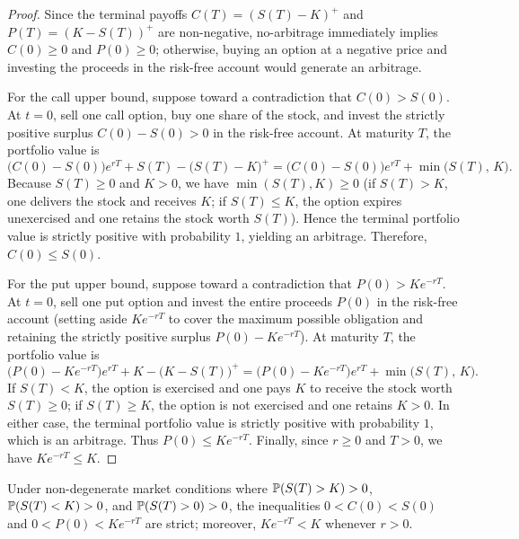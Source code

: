 \begin{proof}
Since the terminal payoffs $C(T) = (S(T) - K)^+$ and $P(T) = (K - S(T))^+$ are non-negative, no-arbitrage immediately implies $C(0) \ge 0$ and $P(0) \ge 0$; otherwise, buying an option at a negative price and investing the proceeds in the risk-free account would generate an arbitrage.

For the call upper bound, suppose toward a contradiction that $C(0) > S(0)$. At $t = 0$, sell one call option, buy one share of the stock, and invest the strictly positive surplus $C(0) - S(0) > 0$ in the risk-free account. At maturity $T$, the portfolio value is
\[
    \bigl(C(0) - S(0)\bigr) e^{rT} + S(T) - \bigl(S(T) - K\bigr)^+ = \bigl(C(0) - S(0)\bigr) e^{rT} + \min\bigl(S(T),\, K\bigr).
\]
Because $S(T) \ge 0$ and $K > 0$, we have $\min(S(T), K) \ge 0$ (if $S(T) > K$, one delivers the stock and receives $K$; if $S(T) \le K$, the option expires unexercised and one retains the stock worth $S(T)$). Hence the terminal portfolio value is strictly positive with probability $1$, yielding an arbitrage. Therefore, $C(0) \le S(0)$.

For the put upper bound, suppose toward a contradiction that $P(0) > K e^{-rT}$. At $t = 0$, sell one put option and invest the entire proceeds $P(0)$ in the risk-free account (setting aside $K e^{-rT}$ to cover the maximum possible obligation and retaining the strictly positive surplus $P(0) - K e^{-rT}$). At maturity $T$, the portfolio value is
\[
    \bigl(P(0) - K e^{-rT}\bigr) e^{rT} + K - \bigl(K - S(T)\bigr)^+ = \bigl(P(0) - K e^{-rT}\bigr) e^{rT} + \min\bigl(S(T),\, K\bigr).
\]
If $S(T) < K$, the option is exercised and one pays $K$ to receive the stock worth $S(T) \ge 0$; if $S(T) \ge K$, the option is not exercised and one retains $K > 0$. In either case, the terminal portfolio value is strictly positive with probability $1$, which is an arbitrage. Thus $P(0) \le K e^{-rT}$. Finally, since $r \ge 0$ and $T > 0$, we have $K e^{-rT} \le K$.
\end{proof}

\begin{remark}
Under non-degenerate market conditions where $\mathbb{P}(S(T) > K) > 0$, $\mathbb{P}(S(T) < K) > 0$, and $\mathbb{P}(S(T) > 0) > 0$, the inequalities $0 < C(0) < S(0)$ and $0 < P(0) < K e^{-rT}$ are strict; moreover, $K e^{-rT} < K$ whenever $r > 0$.
\end{remark}
